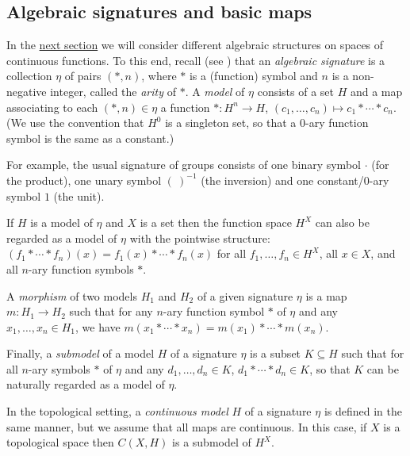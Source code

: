 \documentclass[letter,11pt]{amsart}
\theoremstyle{plain}		\newtheorem{theorem}[generalnumbering]{Theorem}
\theoremstyle{plain}		\newtheorem{corollary}[generalnumbering]{Corollary}
\theoremstyle{definition}		\newtheorem{definition}[generalnumbering]{Definition}
\theoremstyle{definition}		\newtheorem{example}[generalnumbering]{Example}
\theoremstyle{plain}		\newtheorem{proposition}[generalnumbering]{Proposition}
\theoremstyle{plain}		\newtheorem{lemma}[generalnumbering]{Lemma}
\theoremstyle{definition}
\begin{document}
\subsection{Algebraic signatures and basic maps}

In the \hyperref[sectionconsequences]{next section} we will consider different algebraic structures on spaces of continuous functions. To this end, recall (see \cite{MR1221741}) that an \emph{algebraic signature} is a collection $\eta$ of pairs $(*,n)$, where $*$  is a (function) symbol and $n$ is a non-negative integer, called the \emph{arity} of $*$. A \emph{model} of $\eta$ consists of a set $H$ and a map associating to each $(*,n)\in\eta$ a function $*\colon H^n\to H$, $(c_1,\ldots,c_n)\mapsto c_1*\cdots*c_n$. (We use the convention that $H^0$ is a singleton set, so that a $0$-ary function symbol is the same as a constant.)

For example, the usual signature of groups consists of one binary symbol $\cdot$ (for the product), one unary symbol $(\ )^{-1}$ (the inversion) and one constant/0-ary symbol $1$ (the unit).

If $H$ is a model of $\eta$ and $X$ is a set then the function space $H^X$ can also be regarded as a model of $\eta$ with the pointwise structure: $(f_1*\cdots*f_n)(x)=f_1(x)*\cdots*f_n(x)$ for all $f_1,\ldots,f_n\in H^X$, all $x\in X$, and all $n$-ary function symbols $\ast$.

A \emph{morphism} of two models $H_1$ and $H_2$ of a given signature $\eta$ is a map $m\colon H_1\to H_2$ such that for any $n$-ary function symbol $*$ of $\eta$ and any $x_1,\ldots,x_n\in H_1$, we have $m(x_1*\cdots*x_n)=m(x_1)*\cdots*m(x_n)$.

Finally, a \emph{submodel} of a model $H$ of a signature $\eta$ is a subset $K\subseteq H$ such that for all $n$-ary symbols $*$ of $\eta$ and any $d_1,\ldots,d_n\in K$, $d_1*\cdots*d_n\in K$, so that $K$ can be naturally regarded as a model of $\eta$.

In the topological setting, a \emph{continuous model} $H$ of a signature $\eta$ is defined in the same manner, but we assume that all maps are continuous. In this case, if $X$ is a topological space then $C(X,H)$ is a submodel of $H^X$.
\end{document}
